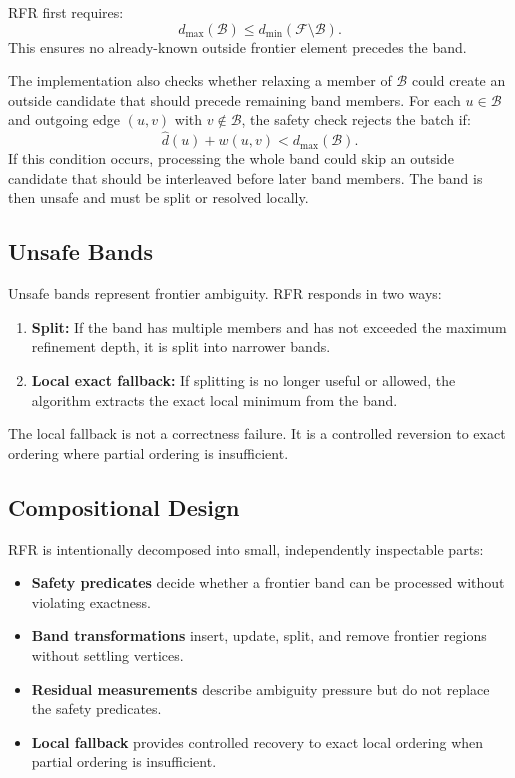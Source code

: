 \documentclass[11pt]{article}
\newcommand{\RFR}{\textsc{RFR}}
\newcommand{\frontier}{\mathcal{F}}
\newcommand{\band}{\mathcal{B}}
\begin{document}
\RFR{} first requires:
\[
  d_{\max}(\band) \le d_{\min}(\frontier\setminus \band).
\]
This ensures no already-known outside frontier element precedes the band.

The implementation also checks whether relaxing a member of $\band$ could create an outside candidate that should precede remaining band members. For each $u\in\band$ and outgoing edge $(u,v)$ with $v\notin\band$, the safety check rejects the batch if:
\[
  \hat d(u)+w(u,v) < d_{\max}(\band).
\]
If this condition occurs, processing the whole band could skip an outside candidate that should be interleaved before later band members. The band is then unsafe and must be split or resolved locally.

\subsection{Unsafe Bands}

Unsafe bands represent frontier ambiguity. \RFR{} responds in two ways:

\begin{enumerate}
  \item \textbf{Split:} If the band has multiple members and has not exceeded the maximum refinement depth, it is split into narrower bands.
  \item \textbf{Local exact fallback:} If splitting is no longer useful or allowed, the algorithm extracts the exact local minimum from the band.
\end{enumerate}

The local fallback is not a correctness failure. It is a controlled reversion to exact ordering where partial ordering is insufficient.

\subsection{Compositional Design}

\RFR{} is intentionally decomposed into small, independently inspectable parts:

\begin{itemize}
  \item \textbf{Safety predicates} decide whether a frontier band can be processed without violating exactness.
  \item \textbf{Band transformations} insert, update, split, and remove frontier regions without settling vertices.
  \item \textbf{Residual measurements} describe ambiguity pressure but do not replace the safety predicates.
  \item \textbf{Local fallback} provides controlled recovery to exact local ordering when partial ordering is insufficient.
\end{itemize}
\end{document}
